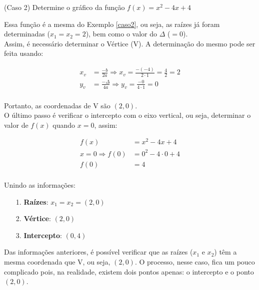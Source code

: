 \begin{example}
	(Caso 2) Determine o gráfico da função $f(x)=x^2-4x+4$
	
	\solucao
	
	Essa função é a mesma do Exemplo \ref{caso2}, ou seja, as raízes já foram determinadas ($x_1 =x_2= 2$), bem como o valor do $\Delta$ ($= 0$).\\
	
	Assim, é necessário determinar o Vértice (V). A determinação do mesmo pode ser feita usando:
	
	\begin{ceqn}
		\begin{align*}
		x_v &= \frac{-b}{2a} \Rightarrow x_v = \frac{-(-4)}{2 \cdot 1} = \frac{4}{2}=2 \\
		y_v &= \frac{-\Delta}{4a} \Rightarrow y_v = \frac{-0}{4 \cdot 1} = 0 \\
		\end{align*}
	\end{ceqn}
	
	Portanto, as coordenadas de V são $\left ( 2,0 \right )$.\\
	
	O último passo é verificar o intercepto com o eixo vertical, ou seja, determinar o valor de $f(x)$ quando $x=0$, assim:
	
	\begin{ceqn}
		\begin{align*}
		f(x) &= x^2-4x+4 \\
		x=0 \Rightarrow f(0)&=0^2-4 \cdot 0 +4 \\
		f(0) &= 4\\ 
		\end{align*}
	\end{ceqn}
	
	Unindo as informações:\\
	\begin{itemize}
		\item[1.]{\textbf{Raízes}: $x_1=x_2=(2,0)$}
		\item[2.]{\textbf{Vértice}: $(2,0)$}
		\item[3.]{\textbf{Intercepto}: $(0,4)$}\\
	\end{itemize}
	Das informações anteriores, é possível verificar que as raízes ($x_1$ e $x_2$) têm a mesma coordenada que V, ou seja, $(2,0)$. O processo, nesse caso, fica um pouco complicado pois, na realidade, existem dois pontos apenas: o intercepto e o ponto $(2,0)$.\\
	

\end{example}
